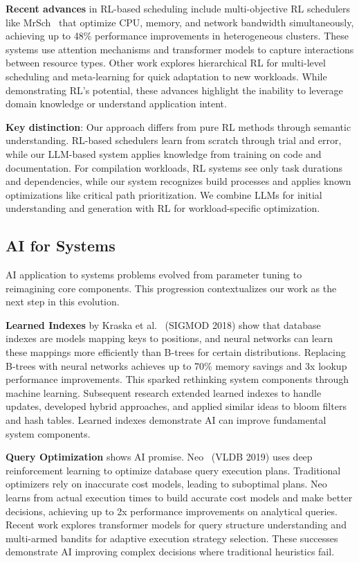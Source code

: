 \textbf{Recent advances} in RL-based scheduling include multi-objective RL schedulers like MrSch~\cite{zhang2024mrsch} that optimize CPU, memory, and network bandwidth simultaneously, achieving up to 48\% performance improvements in heterogeneous clusters. These systems use attention mechanisms and transformer models to capture interactions between resource types. Other work explores hierarchical RL for multi-level scheduling and meta-learning for quick adaptation to new workloads. While demonstrating RL's potential, these advances highlight the inability to leverage domain knowledge or understand application intent.

\textbf{Key distinction}: Our approach differs from pure RL methods through semantic understanding. RL-based schedulers learn from scratch through trial and error, while our LLM-based system applies knowledge from training on code and documentation. For compilation workloads, RL systems see only task durations and dependencies, while our system recognizes build processes and applies known optimizations like critical path prioritization. We combine LLMs for initial understanding and generation with RL for workload-specific optimization.

\subsection{AI for Systems}

AI application to systems problems evolved from parameter tuning to reimagining core components. This progression contextualizes our work as the next step in this evolution.

\textbf{Learned Indexes} by Kraska et al.~\cite{kraska2018learned} (SIGMOD 2018) show that database indexes are models mapping keys to positions, and neural networks can learn these mappings more efficiently than B-trees for certain distributions. Replacing B-trees with neural networks achieves up to 70\% memory savings and 3x lookup performance improvements. This sparked rethinking system components through machine learning. Subsequent research extended learned indexes to handle updates, developed hybrid approaches, and applied similar ideas to bloom filters and hash tables. Learned indexes demonstrate AI can improve fundamental system components.

\textbf{Query Optimization} shows AI promise. Neo~\cite{marcus2019neo} (VLDB 2019) uses deep reinforcement learning to optimize database query execution plans. Traditional optimizers rely on inaccurate cost models, leading to suboptimal plans. Neo learns from actual execution times to build accurate cost models and make better decisions, achieving up to 2x performance improvements on analytical queries. Recent work explores transformer models for query structure understanding and multi-armed bandits for adaptive execution strategy selection. These successes demonstrate AI improving complex decisions where traditional heuristics fail.

